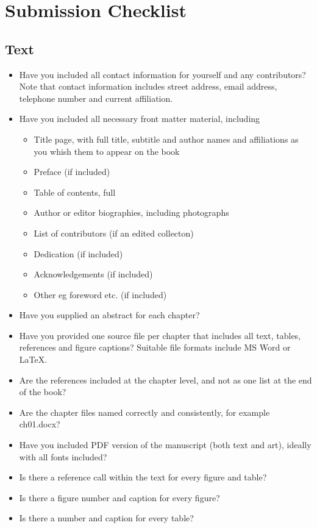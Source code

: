 \chapter{Submission Checklist}
\label{chap:SubList}



\section*{Text}
\begin{itemize}
\item  Have you included all contact information for yourself and any contributors? Note that contact information includes street address, email address, telephone number and current affiliation.


\item  Have you included all necessary front matter material,  including
\begin{itemize}
\item  Title page, with full title, subtitle and author names and affiliations as you whish them to appear on the  book
\item  Preface (if included)
\item  Table of contents, full
\item  Author or editor biographies, including photographs
\item  List of contributors (if an edited collecton)
\item  Dedication (if included)
\item  Acknowledgements (if included)
\item  Other eg foreword etc. (if included)
\end{itemize} 

\item  Have you supplied an abstract for each chapter?

\item  Have you provided one source file  per chapter that includes all text, tables, references and figure captions?   Suitable file formats include MS Word or \LaTeX.

\item  Are the references included at the chapter level, and not as one list at the end of the book?


\item  Are the chapter files named correctly and consistently, for example ch01.docx?

\item  Have you included PDF version of the manuscript (both text and art), ideally with all fonts included?

\item  Is there a reference call within the text for every figure and table?

\item  Is there a figure number and caption for every figure?

\item  Is there a  number and caption for every table?


\end{itemize}


